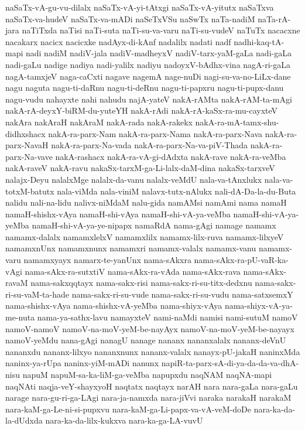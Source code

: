 {naSaTx-vA-gu-vu-dilalx
naSaTx-vA-yi-tAtxgi
naSaTx-vA-yitutx
naSaTxva
naSaTx-va-hudeV
naSaTx-va-mADi
naSeTxVSu
naSwTx
naTa-nadiM
naTa-rA-jara
naTiTxda
naTisi
naTi-suta
naTi-su-va-varu
naTi-su-vudeV
naTuTx
nacacxne
nacakarx
nacicx
nacicxke
nadAyx-di-kAnf
nadalilx
nadati
nadf
nadhi-kaq-tA-mapi
nadi
nadiM
nadiV-jala
nadiV-madheyxV
nadiV-tarx-yaM-gaLa
nadi-gaLa
nadi-gaLu
nadige
nadiya
nadi-yalilx
nadiyu
nadoyxV-bAdhx-vina
nagA-ri-gaLa
nagA-tamxjeV
naga-caCxti
nagave
nagemA
nage-nuDi
nagi-su-va-no-LiLx-dane
nagu
naguta
nagu-ti-daRnu
nagu-ti-deRnu
nagu-ti-papxru
nagu-ti-pupx-danu
nagu-vudu
nahayxte
nahi
nahudu
najA-yateV
nakA-rAMta
nakA-rAM-ta-mAgi
nakA-rA-deyxY-biRM-du-yuteYH
nakA-rAdi
nakA-rA-kaSx-ra-mu-cayxteV
nakAra
nakAraH
nakAraM
nakA-rada
nakA-rakekx
nakA-ra-mA-tamx-shu-didhxshacx
nakA-ra-parx-Nam
nakA-ra-parx-Nama
nakA-ra-parx-Nava
nakA-ra-parx-NavaH
nakA-ra-parx-Na-vada
nakA-ra-parx-Na-va-piV-Thada
nakA-ra-parx-Na-vave
nakA-rashacx
nakA-ra-vA-gi-dAdxta
nakA-rave
nakA-ra-veMba
nakA-raveV
nakA-ravu
nakaSx-tarxM-ga-Li-lalx-daM-dina
nakaSx-tarxveV
nalajx-Deyu
nalalxMge
nalalx-da-vanu
nalalx-veMdU
nala-va-tAnxlukx
nala-va-totxM-batutx
nala-viMda
nala-viniM
nalavx-tutx-nAlukx
nali-dA-Da-la-du-Buta
nalidu
nali-na-lidu
nalivx-niMdaM
nalu-gida
namAMsi
namAmi
nama
namaH
namaH-shishx-vAya
namaH-shi-vAya
namaH-shi-vA-ya-veMba
namaH-shi-vA-ya-yeMba
namaH-shi-vA-ya-ye-nipapx
namaRdA
nama-gAgi
namage
namamx
namamx-dalalx
namamxlelxV
namamxlilx
namamx-lilx-ruva
namamx-lilxyeV
namamxnUnx
namamxnunx
namamxri
namamx-valalx
namamx-vanu
namamx-varu
namamxyayx
namarx-te-yanUnx
nama-sAkxra
nama-sAkx-ra-pU-vaR-ka-vAgi
nama-sAkx-ra-sutxtiV
nama-sAkx-ra-vAda
nama-sAkx-rava
nama-sAkx-ravaM
nama-sakxqqtayx
nama-sakx-risi
nama-sakx-ri-su-titx-dedxnu
nama-sakx-ri-su-vaM-ta-hade
nama-sakx-ri-su-vude
nama-sakx-ri-su-vudu
nama-satxsemxY
nama-shishx-vAya
nama-shishx-vA-yeMba
nama-shiyx-vAya
nama-shiyx-vA-ya-me-nuta
nama-ya-sathx-lavu
namayxteV
nami-naMdi
namisi
nami-sutuM
namoV
namoV-namoV
namoV-na-moV-yeM-be-nayAyx
namoV-na-moV-yeM-be-nayayx
namoV-yeMdu
nana-gAgi
nanagU
nanage
nananx
nananxalalx
nananx-deVnU
nananxdu
nananx-lilxyo
nananxnunx
nananx-valalx
nanayx-pU-jakaH
naninxMda
naninx-ya-rUpa
naninx-yiM-mADi
nanunx
napiR-ta-parx-sA-di-ya-da-da-va-dhA-nisu
napuM
napuM-sa-ka-liM-ga-veMba
napupxdu
naqNAM
naqNA-mapi
naqNAti
naqja-veY-shayxyoH
naqtatx
naqtayx
narAH
nara
nara-gaLa
nara-gaLu
narage
nara-gu-ri-ga-LAgi
nara-ja-namxda
nara-jiVvi
naraka
narakaH
narakaM
nara-kaM-ga-Le-ni-si-pupxvu
nara-kaM-ga-Li-papx-va-vA-veM-doDe
nara-ka-da-la-dUdxda
nara-ka-da-lilx-kukxva
nara-ka-ga-LA-vuvU
}
